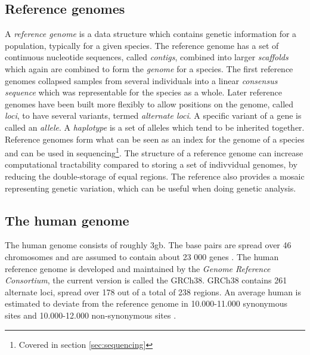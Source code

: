 \documentclass[thesis.tex]{subfiles}
\begin{document}
\subsection{Reference genomes}
A \textit{reference genome} is a data structure which contains genetic information for a population, typically for a given species. The reference genome has a set of continuous nucleotide sequences, called \textit{contigs}, combined into larger \textit{scaffolds} which again are combined to form the \textit{genome} for a species. The first reference genomes collapsed samples from several individuals into a linear \textit{consensus sequence} which was representable for the species as a whole. Later reference genomes have been built more flexibly to allow positions on the genome, called \textit{loci}, to have several variants, termed \textit{alternate loci}. A specific variant of a gene is called an \textit{allele}. A \textit{haplotype} is a set of alleles which tend to be inherited together. Reference genomes form what can be seen as an index for the genome of a species and can be used in sequencing\footnote{Covered in section \ref{sec:sequencing}}. The structure of a reference genome can increase computational tractability compared to storing a set of indivvidual genomes, by reducing the double-storage of equal regions. The reference also provides a mosaic representing genetic variation, which can be useful when doing genetic analysis.\\
\par\noindent
\subsection{The human genome}
\label{sec:human_genome}
The human genome consists of roughly 3gb. The base pairs are spread over 46 chromosomes and are assumed to contain about 23 000 genes \cite{introduction_to_genomics}. The human reference genome is developed and maintained by the \textit{Genome Reference Consortium}\cite{genome_reference_consortium}, the current version is called the GRCh38\cite{grch38}. GRCh38 contains 261 alternate loci, spread over 178 out of a total of 238 regions. An average human is estimated to deviate from the reference genome in 10.000-11.000 synonymous sites and 10.000-12.000 non-synonymous sites \cite{a_map_of_human_genome_variation_from_population_scale_sequencing}.
\end{document}
